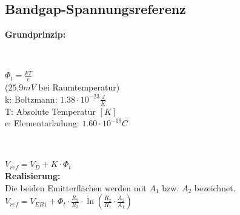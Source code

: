 \begin{multicols}{2}
\subsection{Bandgap-Spannungsreferenz}
	\textbf{Grundprinzip:} \\
	\begin{minipage}{0.4\linewidth}
		 \\
	\end{minipage}
	\begin{minipage}{0.6\linewidth}
		$\Phi_t = \frac{kT}{e}$ \\($25.9mV$ bei Raumtemperatur) \\
		
		k: Boltzmann: $1.38\cdot 10^{-23}\frac{J}{K}$ \\
		T: Absolute Temperatur $[K]$ \\
		e: Elementarladung: $1.60\cdot 10^{-19}C$ \\
	\end{minipage}	

	\begin{minipage}{0.4\linewidth}
		 \\
	\end{minipage}
	\begin{minipage}{0.6\linewidth}
		$V_{ref}=V_D+K\cdot \Phi_t$\\
		
		\textbf{Realisierung:}\\
		Die beiden Emitterflächen werden mit $A_1$ bzw. $A_2$ bezeichnet.\\
		$V_{ref}=V_{EB1}+\Phi_t\cdot\frac{R_2}{R_3}\cdot\ln\left(\frac{R_2}{R_1}\cdot\frac{A_2}{A_1}\right)$ \\
	\end{minipage}		

	

	
\end{multicols}



